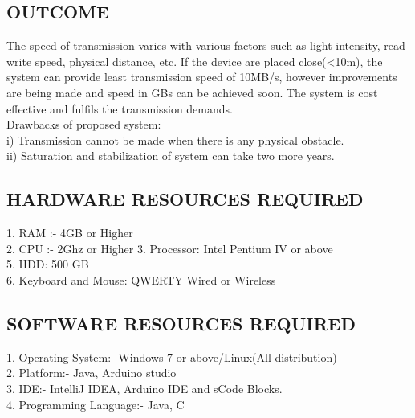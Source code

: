 \documentclass[12pt,a4paper]
{article}
\numberwithin{table}{section}
\begin{document}
{{{{\subsection{OUTCOME}
\begin{itemize}
The speed of transmission varies with various factors such as light intensity, read-write speed, physical distance, etc. If the device are placed close(<10m), the system can provide least transmission speed of 10MB/s, however improvements are being made and speed in GBs can be achieved soon. The system is cost effective and fulfils the transmission demands.\\
Drawbacks of proposed system:\\
i) Transmission cannot be made when there is any physical  obstacle.\\
ii) Saturation and stabilization of system can take two more years.

\end{itemize}



\subsection{HARDWARE RESOURCES REQUIRED}
1.	RAM :- 4GB or Higher \\
2.	CPU :- 2Ghz or Higher
3.  Processor: Intel Pentium IV or above\\
5.  HDD: 500 GB \\
6.  Keyboard and Mouse: QWERTY  Wired or Wireless \\

\subsection{SOFTWARE RESOURCES REQUIRED}
1.	Operating System:- Windows 7 or above/Linux(All distribution)\\
2.	Platform:- Java, Arduino studio \\
3.	IDE:- IntelliJ IDEA, Arduino IDE and sCode Blocks. \\
4.	Programming Language:- Java, C \\












\newpage
\begin{minipage}{15cm}



\end{minipage}}}}}
\end{document}
